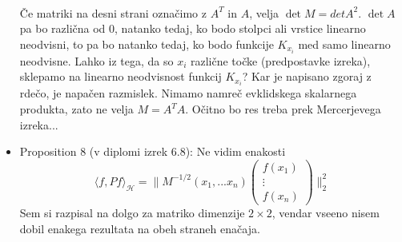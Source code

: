 \documentclass[12pt,a4paper]{amsart}
\theoremstyle{definition} %
\theoremstyle{plain} %
\begin{document}
\begin{itemize}
{\begin{gather*}
\end{gather*}
Če matriki na desni strani označimo z $A^T$ in $A$, velja $\det{M} = det {A^2}$. $\det{A}$ pa bo različna od 0, natanko tedaj, ko bodo stolpci ali vrstice linearno neodvisni, to pa bo natanko tedaj, ko bodo funkcije $K_{x_i}$ med samo linearno neodvisne. Lahko iz tega, da so $x_i$ različne točke (predpostavke izreka), sklepamo na linearno neodvisnost funkcij $K_{x_i}$? }
\newline
Kar je napisano zgoraj z rdečo, je napačen razmislek. Nimamo namreč evklidskega skalarnega produkta, zato ne velja $M = A^T A.$ Očitno bo res treba prek Mercerjevega izreka...
\newline
\item Proposition 8 (v diplomi izrek 6.8): Ne vidim enakosti 
$$\langle f, Pf\rangle_{\mathcal{H}} = \|M^{-1/2}(x_1,...x_n)
\begin{pmatrix}
  f(x_1)  \\
  \vdots     \\
  f(x_n)
 \end{pmatrix}
\|_2^2  
$$
Sem si razpisal na dolgo za matriko dimenzije $2 \times 2$,  vendar vseeno nisem dobil enakega rezultata na obeh straneh enačaja.
\end{itemize}
\end{document}
